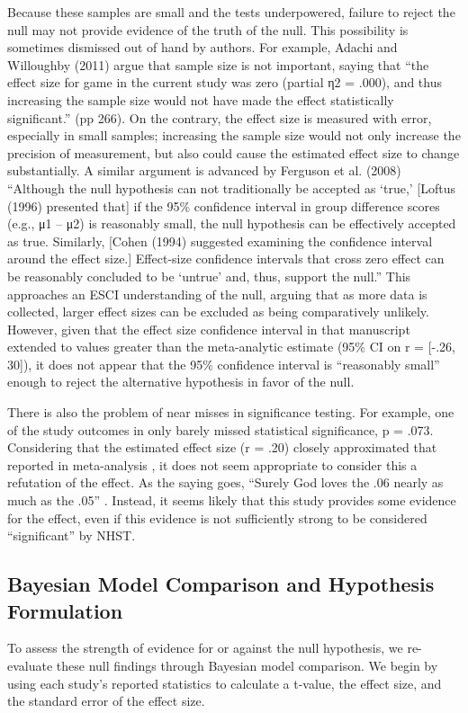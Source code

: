 \documentclass[fignum,nobf,man]{apa}
\begin{document}
Because these samples are small and the tests underpowered, failure to reject the null may not provide evidence of the truth of the null.  This possibility is sometimes dismissed out of hand by authors. For example, Adachi and Willoughby (2011) argue that sample size is not important, saying that ``the effect size for game in the current study was zero (partial η2 = .000), and thus increasing the sample size would not have made the effect statistically significant.'' (pp 266).  On the contrary, the effect size is measured with error, especially in small samples; increasing the sample size would not only increase the precision of measurement, but also could cause the estimated effect size to change substantially. A similar argument is advanced by Ferguson et al. (2008) ``Although the null hypothesis can not traditionally be accepted as `true,' [Loftus (1996) presented that] if the 95\% confidence interval in group difference scores (e.g., μ1 – μ2) is reasonably small, the null hypothesis can be effectively accepted as true. Similarly, [Cohen (1994) suggested examining the confidence interval around the effect size.] Effect-size confidence intervals that cross zero effect can be reasonably concluded to be ‘untrue' and, thus, support the null.''   This approaches an ESCI understanding of the null, arguing that as more data is collected, larger effect sizes can be excluded as being comparatively unlikely. However, given that the effect size confidence interval in that manuscript extended to values greater than the meta-analytic estimate (95\% CI on r = [-.26, 30]), it does not appear that the 95\% confidence interval is ``reasonably small'' enough to reject the alternative hypothesis in favor of the null.

There is also the problem of near misses in significance testing. For example, one of the study outcomes in \citet{Elson:etal:2014} only barely missed statistical significance, p = .073. Considering that the estimated effect size (r = .20) closely approximated that reported in meta-analysis \citep[r = .21,]{Anderson:etal:2010}, it does not seem appropriate to consider this a refutation of the effect. As the saying goes, ``Surely God loves the .06 nearly as much as the .05'' \citep{Rosnow:Rosenthal:1989}. Instead, it seems likely that this study provides some evidence for the effect, even if this evidence is not sufficiently strong to be considered ``significant'' by NHST. 

\subsection{Bayesian Model Comparison and Hypothesis Formulation}
To assess the strength of evidence for or against the null hypothesis, we re-evaluate these null findings through Bayesian model comparison. We begin by using each study's reported statistics to calculate a t-value, the effect size, and the standard error of the effect size.
\end{document}
